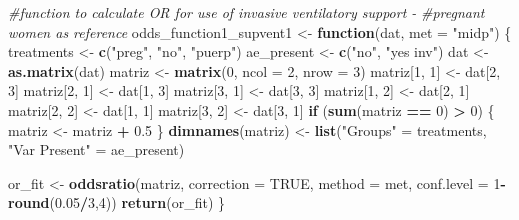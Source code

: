 \documentclass[
]{article}
\newenvironment{Shaded}{\begin{snugshade}}{\end{snugshade}}
\newcommand{\CommentTok}[1]{\textcolor[rgb]{0.56,0.35,0.01}{\textit{#1}}}
\newcommand{\ControlFlowTok}[1]{\textcolor[rgb]{0.13,0.29,0.53}{\textbf{#1}}}
\newcommand{\DataTypeTok}[1]{\textcolor[rgb]{0.13,0.29,0.53}{#1}}
\newcommand{\DecValTok}[1]{\textcolor[rgb]{0.00,0.00,0.81}{#1}}
\newcommand{\FloatTok}[1]{\textcolor[rgb]{0.00,0.00,0.81}{#1}}
\newcommand{\KeywordTok}[1]{\textcolor[rgb]{0.13,0.29,0.53}{\textbf{#1}}}
\newcommand{\NormalTok}[1]{#1}
\newcommand{\OperatorTok}[1]{\textcolor[rgb]{0.81,0.36,0.00}{\textbf{#1}}}
\newcommand{\OtherTok}[1]{\textcolor[rgb]{0.56,0.35,0.01}{#1}}
\newcommand{\StringTok}[1]{\textcolor[rgb]{0.31,0.60,0.02}{#1}}
\begin{document}
\begin{Shaded}
\begin{Highlighting}[]
\CommentTok{#function to calculate OR for use of invasive ventilatory support -}
\CommentTok{#pregnant women as reference}
\NormalTok{odds_function1_supvent1 <-}\StringTok{ }\ControlFlowTok{function}\NormalTok{(dat, }\DataTypeTok{met =} \StringTok{"midp"}\NormalTok{) \{}
\NormalTok{  treatments <-}\StringTok{ }\KeywordTok{c}\NormalTok{(}\StringTok{"preg"}\NormalTok{, }\StringTok{"no"}\NormalTok{, }\StringTok{"puerp"}\NormalTok{)}
\NormalTok{  ae_present <-}\StringTok{ }\KeywordTok{c}\NormalTok{(}\StringTok{"no"}\NormalTok{, }\StringTok{"yes inv"}\NormalTok{)}
\NormalTok{  dat <-}\StringTok{ }\KeywordTok{as.matrix}\NormalTok{(dat)}
\NormalTok{  matriz <-}\StringTok{ }\KeywordTok{matrix}\NormalTok{(}\DecValTok{0}\NormalTok{, }\DataTypeTok{ncol =} \DecValTok{2}\NormalTok{, }\DataTypeTok{nrow =} \DecValTok{3}\NormalTok{)}
\NormalTok{  matriz[}\DecValTok{1}\NormalTok{, }\DecValTok{1}\NormalTok{] <-}\StringTok{ }\NormalTok{dat[}\DecValTok{2}\NormalTok{, }\DecValTok{3}\NormalTok{]}
\NormalTok{  matriz[}\DecValTok{2}\NormalTok{, }\DecValTok{1}\NormalTok{] <-}\StringTok{ }\NormalTok{dat[}\DecValTok{1}\NormalTok{, }\DecValTok{3}\NormalTok{]}
\NormalTok{  matriz[}\DecValTok{3}\NormalTok{, }\DecValTok{1}\NormalTok{] <-}\StringTok{ }\NormalTok{dat[}\DecValTok{3}\NormalTok{, }\DecValTok{3}\NormalTok{]}
\NormalTok{  matriz[}\DecValTok{1}\NormalTok{, }\DecValTok{2}\NormalTok{] <-}\StringTok{ }\NormalTok{dat[}\DecValTok{2}\NormalTok{, }\DecValTok{1}\NormalTok{]}
\NormalTok{  matriz[}\DecValTok{2}\NormalTok{, }\DecValTok{2}\NormalTok{] <-}\StringTok{ }\NormalTok{dat[}\DecValTok{1}\NormalTok{, }\DecValTok{1}\NormalTok{]}
\NormalTok{  matriz[}\DecValTok{3}\NormalTok{, }\DecValTok{2}\NormalTok{] <-}\StringTok{ }\NormalTok{dat[}\DecValTok{3}\NormalTok{, }\DecValTok{1}\NormalTok{]}
  \ControlFlowTok{if}\NormalTok{ (}\KeywordTok{sum}\NormalTok{(matriz }\OperatorTok{==}\StringTok{ }\DecValTok{0}\NormalTok{) }\OperatorTok{>}\StringTok{ }\DecValTok{0}\NormalTok{) \{}
\NormalTok{    matriz <-}\StringTok{ }\NormalTok{matriz }\OperatorTok{+}\StringTok{ }\FloatTok{0.5}
\NormalTok{  \}}
  \KeywordTok{dimnames}\NormalTok{(matriz) <-}\StringTok{ }\KeywordTok{list}\NormalTok{(}\StringTok{"Groups"}\NormalTok{ =}\StringTok{ }\NormalTok{treatments,}
                           \StringTok{"Var Present"}\NormalTok{ =}\StringTok{ }\NormalTok{ae_present)}
  
\NormalTok{  or_fit <-}\StringTok{ }\KeywordTok{oddsratio}\NormalTok{(matriz, }\DataTypeTok{correction =} \OtherTok{TRUE}\NormalTok{, }\DataTypeTok{method =}\NormalTok{ met, }\DataTypeTok{conf.level =} \DecValTok{1}\OperatorTok{-}\KeywordTok{round}\NormalTok{(}\FloatTok{0.05}\OperatorTok{/}\DecValTok{3}\NormalTok{,}\DecValTok{4}\NormalTok{))}
  \KeywordTok{return}\NormalTok{(or_fit)}
\NormalTok{\}}


\end{Highlighting}
\end{Shaded}
\end{document}
